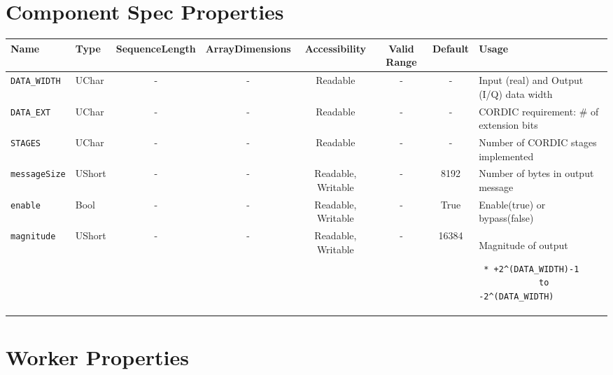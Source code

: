 \documentclass{article}
\begin{document}
\begin{landscape}

	\section*{Component Spec Properties}
	\begin{scriptsize}
		\begin{tabular}{|p{3cm}|p{1.5cm}|c|c|c|c|c|p{7cm}|}
			\hline
			\rowcolor{blue}
			Name               & Type   & SequenceLength & ArrayDimensions & Accessibility      & Valid Range & Default & Usage                                                               \\
			\hline
			\verb+DATA_WIDTH+  & UChar  & -              & -               & Readable           & -           & -       & Input (real) and Output (I/Q) data width                            \\
			\hline
			\verb+DATA_EXT+    & UChar  & -              & -               & Readable           & -           & -       & CORDIC requirement: \# of extension bits                            \\
			\hline
			\verb+STAGES+      & UChar  & -              & -               & Readable           & -           & -       & Number of CORDIC stages implemented                                 \\
			\hline
			\verb+messageSize+ & UShort & -              & -               & Readable, Writable & -           & 8192    & Number of bytes in output message                                   \\
			\hline
			\verb+enable+      & Bool   & -              & -               & Readable, Writable & -           & True    & Enable(true) or bypass(false)                                       \\
			\hline
			\verb+magnitude+   & UShort & -              & -               & Readable, Writable & -           & 16384   & Magnitude of output \scriptsize\begin{verbatim} * +2^(DATA_WIDTH)-1
			to -2^(DATA_WIDTH)\end{verbatim}\\
			\hline
		\end{tabular}
	\end{scriptsize}

	\section*{Worker Properties}

\end{landscape}
\end{document}
